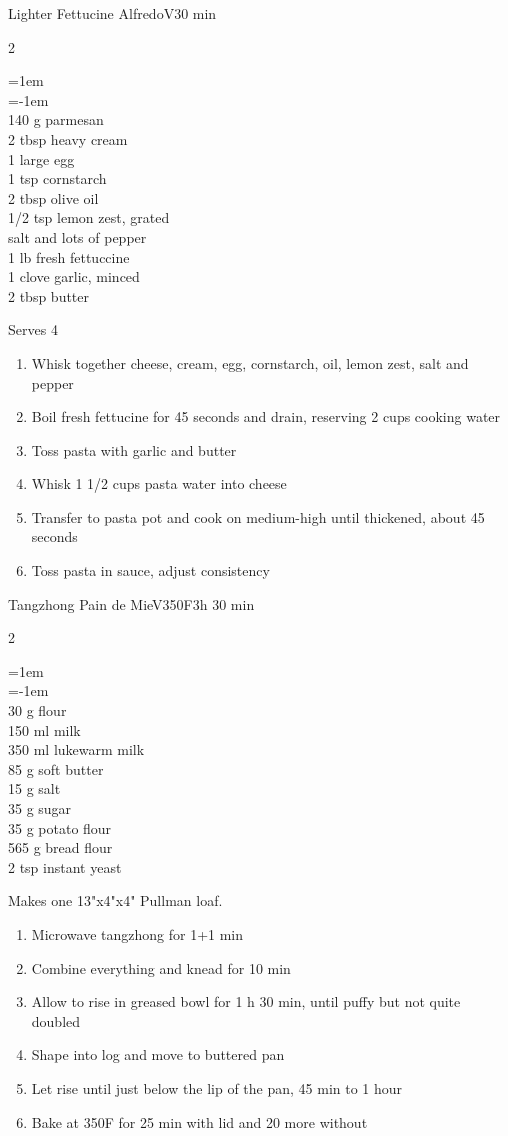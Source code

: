 \documentclass{article}
\makeatletter
\newcommand*{\whiten}[1]{\llap{\textcolor{white}{{\the\SOUL@token}}\hspace{#1pt}}}
\DeclareRobustCommand*\ful{%
    \def\SOUL@everyspace{\underline{\space}\kern\z@}%
    \def\SOUL@everytoken{%
     \setbox0=\hbox{\the\SOUL@token}%
     \ifdim\dp0>\z@
        \raisebox{\dp0}{\underline{\phantom{\the\SOUL@token}}}%
        \whiten{1}\whiten{0}%
        \whiten{-1}\whiten{-2}%
        \llap{\the\SOUL@token}%
     \else
        \underline{\the\SOUL@token}%
     \fi}%
\SOUL@}
\newenvironment{recipe}[3][]
    {\begin{cardbase}[#1]{#2}{#3}
    \columnratio{0.333}
    \begin{paracol}{2}}
    {\end{paracol}\end{cardbase}}
\newcommand{\nextcolumn}{\switchcolumn}
\newenvironment{ingredients}
    {
    \begin{obeylines}
    \vspace{\parskip}
    \setlength{\parskip}{0.25em}
    \vspace{-0.25em}
    \leftskip=1em
    \parindent=-1em}
    {\end{obeylines}}
\newenvironment{steps}
    {\begin{enumerate}[leftmargin=*,topsep=0pt]}
    {\end{enumerate}}
\newcommand{\fahrenheit}[1]{#1\textdegree{}F}
\newcommand{\tag}[1]{\hspace{1em}#1}
\newcommand{\symboltag}[2]{\tag{#1\hspace{0.4em}#2}}
\newcommand{\totaltime}[1]{\symboltag{\raisebox{-0.1em}{\small\StopWatchEnd}}{#1}}
\newcommand{\preheat}[1]{\symboltag{\Topbottomheat}{#1}}
\newcommand{\ihead}[1]{\ful{#1}}
\makeatother
\begin{document}
\begin{recipe}{Lighter Fettucine Alfredo}{\tag{V}\totaltime{30 min}}
\begin{ingredients}
140 g parmesan
2 tbsp heavy cream
1 large egg
1 tsp cornstarch
2 tbsp olive oil
1/2 tsp lemon zest, grated
salt and lots of pepper
1 lb fresh fettuccine
1 clove garlic, minced
2 tbsp butter
\end{ingredients}
\nextcolumn
Serves 4
\begin{steps}
    \item Whisk together cheese, cream, egg, cornstarch, oil, lemon zest, salt and pepper
    \item Boil fresh fettucine for 45 seconds and drain, reserving 2 cups cooking water
    \item Toss pasta with garlic and butter
    \item Whisk 1 1/2 cups pasta water into cheese
    \item Transfer to pasta pot and cook on medium-high until thickened, about 45 seconds
    \item Toss pasta in sauce, adjust consistency
\end{steps}
\end{recipe}

\begin{recipe}{Tangzhong Pain de Mie}{\tag{V}\preheat{\fahrenheit{350}}\totaltime{3h 30 min}}
\begin{ingredients}
\ihead{Tangzhong}
30 g flour
150 ml milk
\ihead{Dough}
350 ml lukewarm milk
85 g soft butter
15 g salt
35 g sugar
35 g potato flour
565 g bread flour
2 tsp instant yeast
\end{ingredients}
\nextcolumn
Makes one 13"x4"x4" Pullman loaf.
\begin{steps}
    \item Microwave tangzhong for 1+1 min
    \item Combine everything and knead for 10 min
    \item Allow to rise in greased bowl for 1 h 30 min, until puffy but not quite doubled
    \item Shape into log and move to buttered pan
    \item Let rise until just below the lip of the pan, 45 min to 1 hour
    \item Bake at \fahrenheit{350} for 25 min with lid and 20 more without
\end{steps}
\end{recipe}
\end{document}
